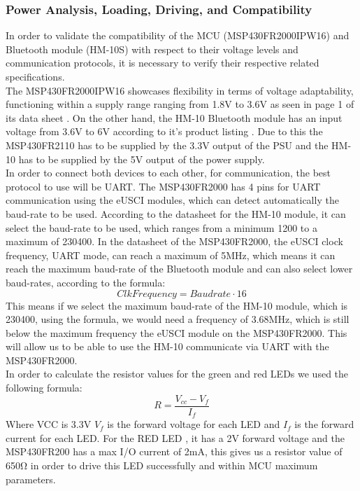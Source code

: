 \subsubsection{Power Analysis, Loading, Driving, and Compatibility}
In order to validate the compatibility of the MCU (MSP430FR2000IPW16) and Bluetooth module (HM-10S) with respect to their voltage levels and communication protocols, it is necessary to verify their respective related specifications.\\
The MSP430FR2000IPW16 showcases flexibility in terms of voltage adaptability, functioning within a supply range ranging from 1.8V to 3.6V as seen in page 1 of its data sheet \cite{MSP430FR2000IPW16}. On the other hand, the HM-10 Bluetooth module has an input voltage from 3.6\si{\V} to 6\si{\V} according to it's product listing \cite{AmazonComHiLetgo}. Due to this the MSP430FR2110 has to be supplied by the 3.3\si{V} output of the PSU and the HM-10 has to be supplied by the 5\si{\V} output of the power supply.\\
In order to connect both devices to each other, for communication, the best protocol to use will be UART. The MSP430FR2000 has 4 pins for UART communication using the eUSCI modules, which can detect automatically the baud-rate to be used. According to the datasheet for the HM-10 module\cite{AmazonComHiLetgo}, it can select the baud-rate to be used, which ranges from a minimum 1200 to a maximum of 230400. In the datasheet of the MSP430FR2000, the eUSCI clock frequency, UART mode, can reach a maximum of 5MHz, which means it can reach the maximum baud-rate of the Bluetooth module and can also select lower baud-rates, according to the formula:
\begin{equation}
	Clk Frequency = Baudrate \cdot 16
\end{equation}
This means if we select the maximum baud-rate of the HM-10 module, which is 230400, using the formula, we would need a frequency of 3.68MHz, which is still below the maximum frequency the eUSCI module on the MSP430FR2000. This will allow us to be able to use the HM-10 communicate via UART with the MSP430FR2000.\\
In order to calculate the resistor values for the green and red LEDs we used the following formula:
\begin{equation}
R = \frac{V_{cc} - V_{f}}{I_{f}}
\end{equation}
Where VCC is 3.3\si{\V} $V_{f}$ is the forward voltage for each LED and $I_{f}$ is the forward current for each LED. For the RED LED \cite{SSLLX3052ID}, it has a 2\si{\V} forward voltage and the MSP430FR200 has a max I/O current of 2\si{\mA}, this gives us a resistor value of  650\si{\ohm} in order to drive this LED successfully and within MCU maximum parameters.\\
